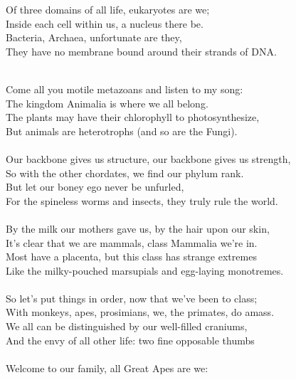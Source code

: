 \documentclass[twoside,13pt,openany,letterpaper]{memoir}%
\begin{document}

Of three domains of all life, eukaryotes are we;\\
Inside each cell within us, a nucleus there be.\\
Bacteria, Archaea, unfortunate are they,\\
They have no membrane bound around their strands of DNA.\\
\\

Come all you motile metazoans and listen to my song:\\
The kingdom Animalia is where we all belong.\\
The plants may have their chlorophyll to photosynthesize,\\
But animals are heterotrophs (and so are the Fungi).\\
\\
Our backbone gives us structure, our backbone gives us strength,\\
So with the other chordates, we find our phylum rank.\\
But let our boney ego never be unfurled,\\
For the spineless worms and insects, they truly rule the world.\\
\\
By the milk our mothers gave us, by the hair upon our skin,\\
It’s clear that we are mammals, class Mammalia we’re in.\\
Most have a placenta, but this class has strange extremes\\
Like the milky-pouched marsupials and egg-laying monotremes.\\
\\
So let’s put things in order, now that we’ve been to class;\\
With monkeys, apes, prosimians, we, the primates, do amass.\\
We all can be distinguished by our well-filled craniums,\\
And the envy of all other life: two fine opposable thumbs\\
\\
Welcome to our family, all Great Apes are we:\\
\end{document}
